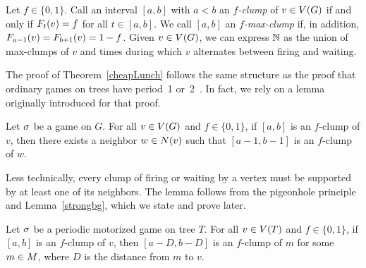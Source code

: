 Let $f \in \{0,1\}$. Call an interval $[a, b]$ with $a < b$ an \emph{$f$-clump}
of $v \in \V$ if and only if $\firing{v}{t} = f$ for all $t \in [a, b]$. We
call $[a, b]$ an \emph{$f$-max-clump} if, in addition, $\firing{v}{a-1} =
\firing{v}{b+1} = 1-f$. Given $v \in \V$, we can express $\nats$ as the union
of max-clumps of $v$ and times during which $v$ alternates between firing and
waiting.

The proof of Theorem~\ref{cheapLunch} follows the same structure as the proof
that ordinary games on trees have period~1 or~2~\cite{bitarGoles}. In fact, we
rely on a lemma originally introduced for that proof.

\begin{lem} \label{bitarGoles}
Let $\s$ be a game on $G$. For all $v \in \V$ and $f \in \{0,1\}$, if $[a, b]$
is an $f$-clump of $v$, then there exists a neighbor $w \in \N{v}$ such that
$[a-1, b-1]$ is an $f$-clump of $w$.
\end{lem}

Less technically, every clump of firing or waiting by a vertex must be
supported by at least one of its neighbors. The lemma follows from the
pigeonhole principle and Lemma~\ref{strongbg}, which we state and prove later.

\begin{thm} \label{cheapLunch}
Let $\s$ be a periodic motorized game on tree $T$. For all $v \in \V[T]$ and
$f \in \{0,1\}$, if $[a, b]$ is an $f$-clump of $v$, then $[a-D, b-D]$ is an
$f$-clump of $m$ for some $m \in \mots$, where $D$ is the distance from $m$ to
$v$.
\end{thm}


